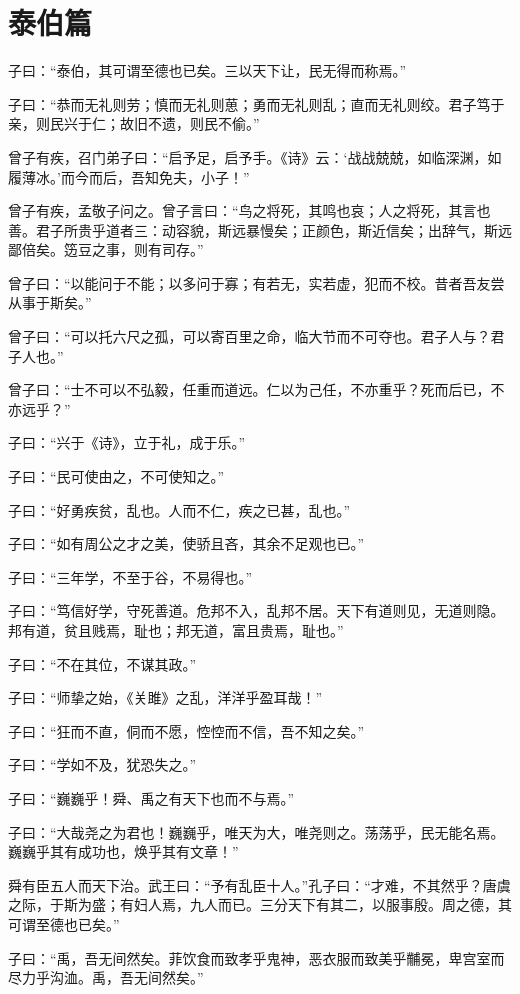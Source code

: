 \documentclass[12pt,a4paper]{ctexbook}
\begin{document}
\section{泰伯篇}
子曰：“泰伯，其可谓至德也已矣。三以天下让，民无得而称焉。”\par
子曰：“恭而无礼则劳；慎而无礼则葸；勇而无礼则乱；直而无礼则绞。君子笃于亲，则民兴于仁；故旧不遗，则民不偷。”\par
曾子有疾，召门弟子曰：“启予足，启予手。《诗》云：‘战战兢兢，如临深渊，如履薄冰。’而今而后，吾知免夫，小子！”\par
曾子有疾，孟敬子问之。曾子言曰：“鸟之将死，其鸣也哀；人之将死，其言也善。君子所贵乎道者三：动容貌，斯远暴慢矣；正颜色，斯近信矣；出辞气，斯远鄙倍矣。笾豆之事，则有司存。”\par
曾子曰：“以能问于不能；以多问于寡；有若无，实若虚，犯而不校。昔者吾友尝从事于斯矣。”\par
曾子曰：“可以托六尺之孤，可以寄百里之命，临大节而不可夺也。君子人与？君子人也。”\par
曾子曰：“士不可以不弘毅，任重而道远。仁以为己任，不亦重乎？死而后已，不亦远乎？”\par
子曰：“兴于《诗》，立于礼，成于乐。”\par
子曰：“民可使由之，不可使知之。”\par
子曰：“好勇疾贫，乱也。人而不仁，疾之已甚，乱也。”\par
子曰：“如有周公之才之美，使骄且吝，其余不足观也已。”\par
子曰：“三年学，不至于谷，不易得也。”\par
子曰：“笃信好学，守死善道。危邦不入，乱邦不居。天下有道则见，无道则隐。邦有道，贫且贱焉，耻也；邦无道，富且贵焉，耻也。”\par
子曰：“不在其位，不谋其政。”\par
子曰：“师挚之始，《关雎》之乱，洋洋乎盈耳哉！”\par
子曰：“狂而不直，侗而不愿，悾悾而不信，吾不知之矣。”\par
子曰：“学如不及，犹恐失之。”\par
子曰：“巍巍乎！舜、禹之有天下也而不与焉。”\par
子曰：“大哉尧之为君也！巍巍乎，唯天为大，唯尧则之。荡荡乎，民无能名焉。巍巍乎其有成功也，焕乎其有文章！”\par
舜有臣五人而天下治。武王曰：“予有乱臣十人。”孔子曰：“才难，不其然乎？唐虞之际，于斯为盛；有妇人焉，九人而已。三分天下有其二，以服事殷。周之德，其可谓至德也已矣。”\par
子曰：“禹，吾无间然矣。菲饮食而致孝乎鬼神，恶衣服而致美乎黼冕，卑宫室而尽力乎沟洫。禹，吾无间然矣。”\par
\end{document}
